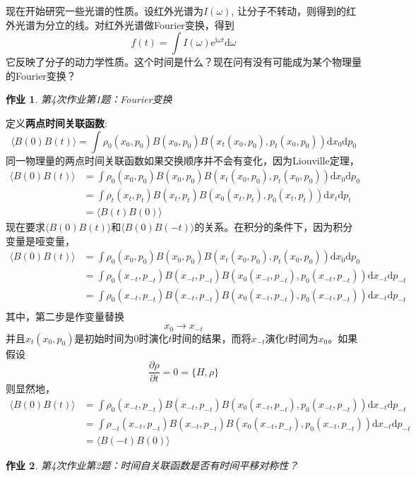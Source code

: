 \documentclass[12pt]{article}
\newtheorem{asg}{作业}
\begin{document}
    现在开始研究一些光谱的性质。设红外光谱为$I(\omega)$, 让分子不转动，则得到的红外光谱为分立的线。对红外光谱做Fourier变换，得到
    \begin{equation*}
    f(t) = \int I(\omega)\mathrm{e}^{\mathrm{i}\omega t}\mathrm{d}\omega 
    \end{equation*}
    它反映了分子的动力学性质。这个时间是什么？现在问有没有可能成为某个物理量的Fourier变换？
    \begin{asg}
        第4次作业第1题：Fourier变换
    \end{asg}
    定义\textbf{两点时间关联函数}:
    \begin{equation*}
    \langle B(0)B(t) \rangle = \int \rho_0(x_0,p_0) B(x_0,p_0) B(x_t(x_0,p_0),p_t(x_0,p_0)) \mathrm{d}x_0 \mathrm{d}p_0
    \end{equation*}
    同一物理量的两点时间关联函数如果交换顺序并不会有变化，因为Liouville定理，
    \begin{align*}
    \langle B(0)B(t) \rangle &= \int \rho_0(x_0,p_0) B(x_0,p_0) B(x_t(x_0,p_0),p_t(x_0,p_0)) \mathrm{d}x_0 \mathrm{d}p_0\\
    &= \int \rho_t(x_t,p_t) B(x_t,p_t) B(x_0(x_t,p_t),p_0(x_t,p_t)) \mathrm{d}x_t \mathrm{d}p_t\\
    &= \langle B(t)B(0) \rangle
    \end{align*}
    现在要求$\langle B(0)B(t) \rangle$和$\langle B(0)B(-t) \rangle$的关系。在积分的条件下，因为积分变量是哑变量，
    \begin{align*}
    \langle B(0)B(t) \rangle &= \int \rho_0(x_0,p_0) B(x_0,p_0) B(x_t(x_0,p_0),p_t(x_0,p_0)) \mathrm{d}x_0 \mathrm{d}p_0\\
    &= \int \rho_0(x_{-t},p_{-t}) B(x_{-t},p_{-t}) B(x_0(x_{-t},p_{-t}),p_0(x_{-t},p_{-t})) \mathrm{d}x_{-t} \mathrm{d}p_{-t}\\
    &= \int \rho_0(x_{-t},p_{-t}) B(x_{-t},p_{-t}) B(x_0(x_{-t},p_{-t}),p_0(x_{-t},p_{-t})) \mathrm{d}x_{-t} \mathrm{d}p_{-t}\\
    \end{align*}
    其中，第二步是作变量替换
    \begin{equation*}
    x_0 \to x_{-t}
    \end{equation*}
    并且$x_t(x_0,p_0)$是初始时间为0时演化$t$时间的结果，而将$x_{-t}$演化$t$时间为$x_0$。如果假设
    \begin{equation*}
    \frac {\partial \rho}{\partial t} = 0 = \{ H, \rho\}
    \end{equation*}
    则显然地，
    \begin{align*}
        \langle B(0)B(t) \rangle &= \int \rho_0(x_{-t},p_{-t}) B(x_{-t},p_{-t}) B(x_0(x_{-t},p_{-t}),p_0(x_{-t},p_{-t})) \mathrm{d}x_{-t} \mathrm{d}p_{-t}\\
        &= \int \rho_{-t}(x_{-t},p_{-t}) B(x_{-t},p_{-t}) B(x_0(x_{-t},p_{-t}),p_0(x_{-t},p_{-t})) \mathrm{d}x_{-t} \mathrm{d}p_{-t}\\
        &= \langle B(-t)B(0) \rangle
    \end{align*}
    \begin{asg}
        第4次作业第2题：时间自关联函数是否有时间平移对称性？
    \end{asg}
\end{document}
